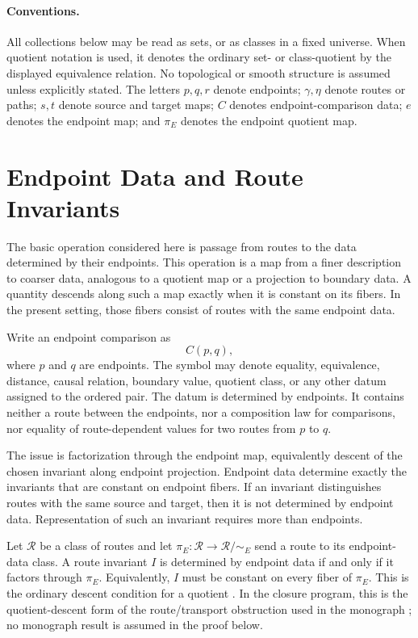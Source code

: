 \documentclass[12pt]{article}
\newcommand{\calR}{\mathcal{R}}
\newcommand{\citep}[1]{\cite{#1}}
\begin{document}
\paragraph{Conventions.}
All collections below may be read as sets, or as classes in a fixed
universe. When quotient notation is used, it denotes the ordinary set- or
class-quotient by the displayed equivalence relation. No topological or
smooth structure is assumed unless explicitly stated. The letters
$p,q,r$ denote endpoints; $\gamma,\eta$ denote routes or paths; $s,t$
denote source and target maps; $C$ denotes endpoint-comparison data; $e$
denotes the endpoint map; and $\pi_E$ denotes the endpoint quotient map.

\section{Endpoint Data and Route Invariants}
\label{sec:intro}

The basic operation considered here is passage from routes to the data
determined by their endpoints. This operation is a map from a finer
description to coarser data, analogous to a quotient map or a projection
to boundary data. A quantity descends along such a map exactly when it is
constant on its fibers. In the present setting, those fibers consist of
routes with the same endpoint data.

Write an endpoint comparison as
\[
  C(p,q),
\]
where $p$ and $q$ are endpoints. The symbol may denote equality,
equivalence, distance, causal relation, boundary value, quotient class,
or any other datum assigned to the ordered pair. The datum is determined
by endpoints. It contains neither a route between the endpoints, nor a
composition law for comparisons, nor equality of route-dependent values
for two routes from $p$ to $q$.

The issue is factorization through the endpoint map, equivalently
descent of the chosen invariant along endpoint projection. Endpoint
data determine exactly the invariants that are constant on endpoint
fibers. If an invariant distinguishes routes with the same source and
target, then it is not determined by endpoint data. Representation of
such an invariant requires more than endpoints.

Let $\calR$ be a class of routes and let
$\pi_E:\calR\to\calR/{\sim_E}$ send a route to its endpoint-data
class. A route invariant $I$ is determined by endpoint data if and only
if it factors through $\pi_E$. Equivalently, $I$ must be constant on every
fiber of $\pi_E$. This is the ordinary descent condition for a quotient
\citep{Munkres2000}.
In the closure program, this is the quotient-descent form of the
route/transport obstruction used in the monograph \citep{WolfeCSM}; no
monograph result is assumed in the proof below.
\end{document}
